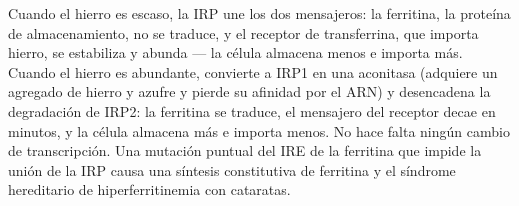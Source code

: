 \begin{example}\label{ex:b3:rna-regulation:iron}
Cuando el hierro es escaso, la IRP une los dos mensajeros: la ferritina,
la proteína de almacenamiento, no se traduce, y el receptor de
transferrina, que importa hierro, se estabiliza y abunda --- la célula
almacena menos e importa más. Cuando el hierro es abundante, convierte a
IRP1 en una aconitasa (adquiere un agregado de hierro y azufre y pierde
su afinidad por el ARN) y desencadena la degradación de IRP2: la
ferritina se traduce, el mensajero del receptor decae en minutos, y la
célula almacena más e importa menos. No hace falta ningún cambio de
transcripción. Una mutación puntual del IRE de la ferritina que impide la
unión de la IRP causa una síntesis constitutiva de ferritina y el
síndrome hereditario de hiperferritinemia con cataratas.
\end{example}

